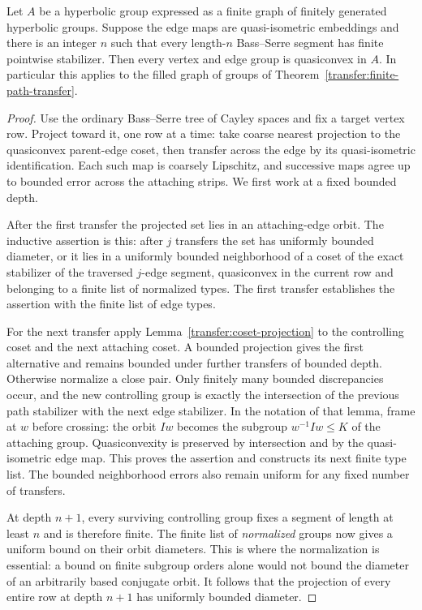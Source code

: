 \begin{proposition}\label{transfer:ambient-qc}
Let \(A\) be a hyperbolic group expressed as a finite graph of finitely generated hyperbolic groups. Suppose the edge maps are quasi-isometric embeddings and there is an integer \(n\) such that every length-\(n\) Bass--Serre segment has finite pointwise stabilizer. Then every vertex and edge group is quasiconvex in \(A\). In particular this applies to the filled graph of groups of Theorem~\ref{transfer:finite-path-transfer}.
\end{proposition}
\begin{proof}
Use the ordinary Bass--Serre tree of Cayley spaces and fix a target
vertex row. Project toward it, one row at a time: take coarse nearest
projection to the quasiconvex parent-edge coset, then transfer across
the edge by its quasi-isometric identification. Each such map is
coarsely Lipschitz, and successive maps agree up to bounded error
across the attaching strips. We first work at a fixed bounded depth.

After the first transfer the projected set lies in an attaching-edge
orbit. The inductive assertion is this: after $j$ transfers the set
has uniformly bounded diameter, or it lies in a uniformly bounded
neighborhood of a coset of the exact stabilizer of the traversed
$j$-edge segment, quasiconvex in the current row and belonging to a
finite list of normalized types. The first transfer establishes the
assertion with the finite list of edge types.

For the next transfer apply Lemma~\ref{transfer:coset-projection} to
the controlling coset and the next attaching coset. A bounded
projection gives the first alternative and remains bounded under
further transfers of bounded depth. Otherwise normalize a close
pair. Only finitely many bounded discrepancies occur, and the new
controlling group is exactly the intersection of the previous path
stabilizer with the next edge stabilizer. In the notation of that
lemma, frame at $w$ before crossing: the orbit $Iw$ becomes the
subgroup $w^{-1}Iw\le K$ of the attaching group. Quasiconvexity is
preserved by intersection and by the quasi-isometric edge map.
This proves the assertion and constructs its next finite type list.
The bounded neighborhood errors also remain uniform for any fixed
number of transfers.

At depth $n+1$, every surviving controlling group fixes a segment
of length at least $n$ and is therefore finite. The finite list of
\emph{normalized} groups now gives a uniform bound on their orbit
diameters. This is where the normalization is essential: a bound on
finite subgroup orders alone would not bound the diameter of an
arbitrarily based conjugate orbit. It follows that the projection
of every entire row at depth $n+1$ has uniformly bounded diameter.


\end{proof}
